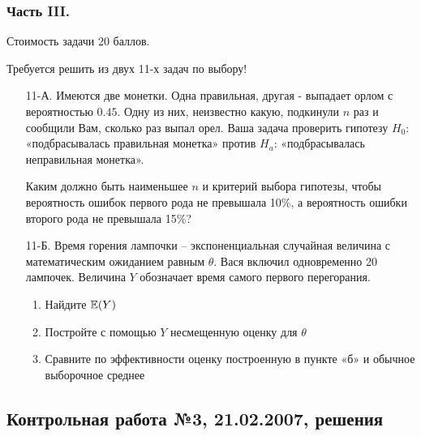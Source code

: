 \subsubsection*{Часть III.}

Стоимость задачи 20 баллов.

Требуется решить \textbf{} из двух 11-х задач по
выбору!

\begin{enumerate}
\item[11-А.] Имеются две монетки. Одна правильная, другая - выпадает орлом с
вероятностью $0.45$. Одну из них, неизвестно какую, подкинули $n$
раз и сообщили Вам, сколько раз выпал орел. Ваша задача проверить
гипотезу $H_{0}$: «подбрасывалась правильная монетка» против
$H_{a}$:
«подбрасывалась неправильная монетка».

Каким должно быть наименьшее $n$ и критерий выбора гипотезы, чтобы
вероятность ошибок первого рода не превышала 10\%, а вероятность
ошибки второго рода не превышала 15\%?

\item[11-Б.] Время горения лампочки – экспоненциальная случайная величина с
математическим ожиданием равным $\theta $. Вася включил
одновременно 20 лампочек. Величина  $Y$ обозначает время самого
первого перегорания.
\begin{enumerate}
\item Найдите $\mathbb{E}(Y)$
\item Постройте с помощью  $Y$ несмещенную оценку для  $\theta$
\item Сравните по эффективности оценку построенную в пункте
«б» и
обычное выборочное среднее
\end{enumerate}
\end{enumerate}

\subsection{Контрольная работа №3, 21.02.2007, решения}


